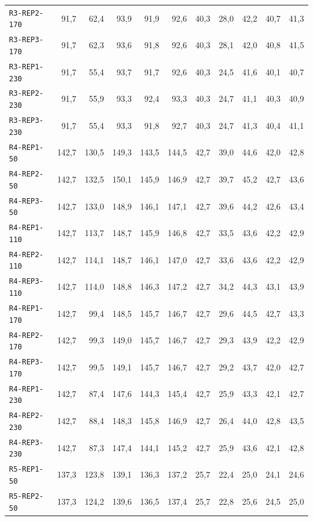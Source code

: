 \begin{footnotesize}
\begin{longtable}{@{}lrrrrrrrrrr@{}}
\texttt{R3-REP2-170} & 91,7 & 62,4 & 93,9 & 91,9 & 92,6 & 40,3 & 28,0 & 42,2 & 40,7 & 41,3 \\
\texttt{R3-REP3-170} & 91,7 & 62,3 & 93,6 & 91,8 & 92,6 & 40,3 & 28,1 & 42,0 & 40,8 & 41,5 \\
\texttt{R3-REP1-230} & 91,7 & 55,4 & 93,7 & 91,7 & 92,6 & 40,3 & 24,5 & 41,6 & 40,1 & 40,7 \\
\texttt{R3-REP2-230} & 91,7 & 55,9 & 93,3 & 92,4 & 93,3 & 40,3 & 24,7 & 41,1 & 40,3 & 40,9 \\
\texttt{R3-REP3-230} & 91,7 & 55,4 & 93,3 & 91,8 & 92,7 & 40,3 & 24,7 & 41,3 & 40,4 & 41,1 \\
\texttt{R4-REP1-50} & 142,7 & 130,5 & 149,3 & 143,5 & 144,5 & 42,7 & 39,0 & 44,6 & 42,0 & 42,8 \\
\texttt{R4-REP2-50} & 142,7 & 132,5 & 150,1 & 145,9 & 146,9 & 42,7 & 39,7 & 45,2 & 42,7 & 43,6 \\
\texttt{R4-REP3-50} & 142,7 & 133,0 & 148,9 & 146,1 & 147,1 & 42,7 & 39,6 & 44,2 & 42,6 & 43,4 \\
\texttt{R4-REP1-110} & 142,7 & 113,7 & 148,7 & 145,9 & 146,8 & 42,7 & 33,5 & 43,6 & 42,2 & 42,9 \\
\texttt{R4-REP2-110} & 142,7 & 114,1 & 148,7 & 146,1 & 147,0 & 42,7 & 33,6 & 43,6 & 42,2 & 42,9 \\
\texttt{R4-REP3-110} & 142,7 & 114,0 & 148,8 & 146,3 & 147,2 & 42,7 & 34,2 & 44,3 & 43,1 & 43,9 \\
\texttt{R4-REP1-170} & 142,7 & 99,4 & 148,5 & 145,7 & 146,7 & 42,7 & 29,6 & 44,5 & 42,7 & 43,3 \\
\texttt{R4-REP2-170} & 142,7 & 99,3 & 149,0 & 145,7 & 146,7 & 42,7 & 29,3 & 43,9 & 42,2 & 42,9 \\
\texttt{R4-REP3-170} & 142,7 & 99,5 & 149,1 & 145,7 & 146,7 & 42,7 & 29,2 & 43,7 & 42,0 & 42,7 \\
\texttt{R4-REP1-230} & 142,7 & 87,4 & 147,6 & 144,3 & 145,4 & 42,7 & 25,9 & 43,3 & 42,1 & 42,7 \\
\texttt{R4-REP2-230} & 142,7 & 88,4 & 148,3 & 145,8 & 146,9 & 42,7 & 26,4 & 44,0 & 42,8 & 43,5 \\
\texttt{R4-REP3-230} & 142,7 & 87,3 & 147,4 & 144,1 & 145,2 & 42,7 & 25,9 & 43,6 & 42,1 & 42,8 \\
\texttt{R5-REP1-50} & 137,3 & 123,8 & 139,1 & 136,3 & 137,2 & 25,7 & 22,4 & 25,0 & 24,1 & 24,6 \\
\texttt{R5-REP2-50} & 137,3 & 124,2 & 139,6 & 136,5 & 137,4 & 25,7 & 22,8 & 25,6 & 24,5 & 25,0 \\

\end{longtable}
\end{footnotesize}
